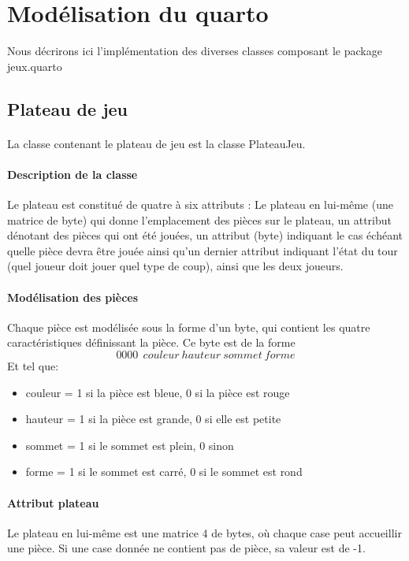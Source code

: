 \documentclass{article}
\begin{document}
\section{Modélisation du quarto}
Nous décrirons ici l'implémentation des diverses classes composant le
package jeux.quarto
\subsection{Plateau de jeu}
\paragraph{}
La classe contenant le plateau de jeu est la classe PlateauJeu.

\paragraph{Description de la classe}
Le plateau est constitué de quatre à six attributs : Le plateau en lui-même (une
matrice de byte) qui donne l'emplacement des pièces sur le plateau, 
un attribut dénotant des pièces qui ont été jouées, un attribut (byte)
indiquant le cas échéant quelle pièce devra être jouée ainsi qu'un dernier
attribut indiquant l'état du tour (quel joueur doit jouer quel type de
coup), ainsi que les deux joueurs.

\paragraph{Modélisation des pièces}
Chaque pièce est modélisée sous la forme d'un byte, qui contient les
quatre caractéristiques définissant la pièce. Ce byte est de la forme 
\[ 0000~~couleur~hauteur~sommet~forme \]
Et tel que:
\begin{itemize}
\item couleur = 1 si la pièce est bleue, 0 si la pièce est rouge
\item hauteur = 1 si la pièce est grande, 0 si elle est petite
\item sommet = 1 si le sommet est plein, 0 sinon
\item forme = 1 si le sommet est carré, 0 si le sommet est rond
\end{itemize}

\paragraph{Attribut plateau}
Le plateau en lui-même est une matrice 4  de bytes, o\`u
chaque case peut accueillir une pièce. Si une case donnée ne contient
pas de pièce, sa valeur est de -1.
\end{document}
